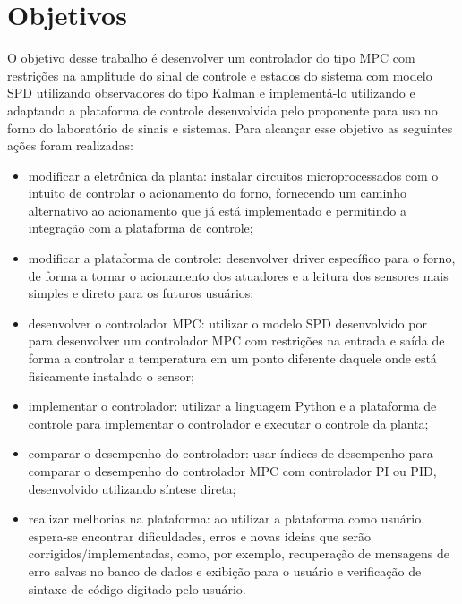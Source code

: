 \section{Objetivos}%
\label{sec:objectives}

O objetivo desse trabalho é desenvolver um controlador do tipo \ac{MPC} com
restrições na amplitude do sinal de controle e estados do sistema com modelo
\ac{SPD} utilizando observadores do tipo Kalman e implementá-lo utilizando e
adaptando a plataforma de controle desenvolvida pelo proponente para uso no
forno do laboratório de sinais e sistemas. Para alcançar esse objetivo as
seguintes ações foram realizadas:

\begin{itemize}
      \item modificar a eletrônica da planta: instalar circuitos
            microprocessados com o intuito de controlar o acionamento do forno,
            fornecendo um caminho alternativo ao acionamento que já está
            implementado e permitindo a integração com a plataforma de controle;
      \item modificar a plataforma de controle: desenvolver driver específico
            para o forno, de forma a tornar o acionamento dos atuadores e a
            leitura dos sensores mais simples e direto para os futuros usuários;
      \item desenvolver o controlador \ac{MPC}\@: utilizar o modelo \ac{SPD}
            desenvolvido por~\textcite{masterthesis:nelson} para desenvolver um
            controlador \ac{MPC} com restrições na entrada e saída de forma a
            controlar a temperatura em um ponto diferente daquele onde está
            fisicamente instalado o sensor;
      \item implementar o controlador: utilizar a linguagem Python e a
            plataforma de controle para implementar o controlador e executar o
            controle da planta;
      \item comparar o desempenho do controlador: usar índices de desempenho
            para comparar o desempenho do controlador \ac{MPC} com controlador
            PI ou PID, desenvolvido utilizando síntese direta;
      \item realizar melhorias na plataforma: ao utilizar a plataforma como
            usuário, espera-se encontrar dificuldades, erros e novas ideias que
            serão corrigidos/implementadas, como, por exemplo, recuperação de
            mensagens de erro salvas no banco de dados e exibição para o usuário
            e verificação de sintaxe de código digitado pelo usuário.
\end{itemize}

